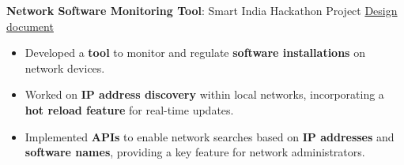 \documentclass[a4paper,20pt]{article}
\newcommand{\resumeItem}[2]{
  \item\small{
    \textbf{#1}{: #2 \vspace{-2pt}}
  }
}
\newcommand{\resumeSubItem}[2]{\resumeItem{#1}{#2}\vspace{-3pt}}
\begin{document}
\resumeSubItem{Network Software Monitoring Tool}{Smart India Hackathon Project \textbar{} \href{https://drive.google.com/file/d/1qiZesrt7hEhPYErSuQzsLiEyiWKDYhZi/view?usp=sharing}{Design document}}
\vspace{-2pt}
\begin{itemize}
\item Developed a \textbf{tool} to monitor and regulate \textbf{software installations} on network devices.  
\vspace{-3pt}
\item Worked on \textbf{IP address discovery} within local networks, incorporating a \textbf{hot reload feature} for real-time updates.  
\vspace{-3pt}
\item Implemented \textbf{APIs} to enable network searches based on \textbf{IP addresses} and \textbf{software names}, providing a key feature for network administrators.
\end{itemize}
\end{document}
